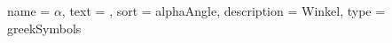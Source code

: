 
{
 name        = {$\alpha$},
 text        = {\alpha},
 sort        = alphaAngle,
 description = {Winkel},
 type        = greekSymbols
}
